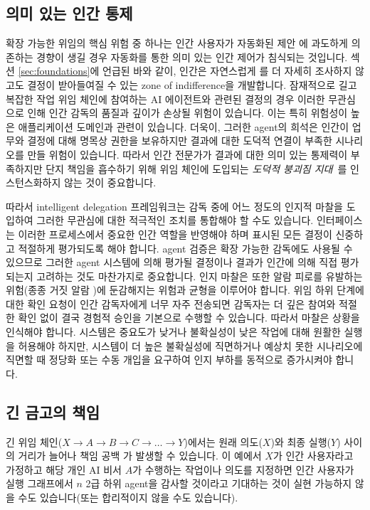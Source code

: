 \documentclass[11pt, a4paper, twocolumn, copyright, goog]{google}
\begin{document}
\subsection{의미 있는 인간 통제}

확장 가능한 위임의 핵심 위험 중 하나는 인간 사용자가 자동화된 제안 \citep{dzindolet2003role, logg2019algorithm}에 과도하게 의존하는 경향이 생길 경우 자동화를 통한 의미 있는 인간 제어가 침식되는 것입니다. 섹션 \ref{sec:foundations}에 언급된 바와 같이, 인간은 자연스럽게 \citep{parasuraman1993performance, green2022flaws}를 더 자세히 조사하지 않고도 결정이 받아들여질 수 있는 zone of indifference을 개발합니다. 잠재적으로 길고 복잡한 작업 위임 체인에 참여하는 AI 에이전트와 관련된 결정의 경우 이러한 무관심으로 인해 인간 감독의 품질과 깊이가 손상될 위험이 있습니다. 이는 특히 위험성이 높은 애플리케이션 도메인과 관련이 있습니다. 더욱이, 그러한 agent의 희석은 인간이 업무와 결정에 대해 명목상 권한을 보유하지만 결과에 대한 도덕적 연결이 부족한 시나리오를 만들 위험이 있습니다. 따라서 인간 전문가가 결과에 대한 의미 있는 통제력이 부족하지만 단지 책임을 흡수하기 위해 위임 체인에 도입되는 \emph{도덕적 붕괴짐 지대}~\citep{elish2019moral}를 인스턴스화하지 않는 것이 중요합니다.

따라서 intelligent delegation 프레임워크는 \citep{bader2019algorithmic} 감독 중에 어느 정도의 인지적 마찰을 도입하여 그러한 무관심에 대한 적극적인 조치를 통합해야 할 수도 있습니다. 인터페이스는 이러한 프로세스에서 중요한 인간 역할을 반영해야 하며 표시된 모든 결정이 신중하고 적절하게 평가되도록 해야 합니다. agent 검증은 확장 가능한 감독에도 사용될 수 있으므로 그러한 agent 시스템에 의해 평가될 결정이나 결과가 인간에 의해 직접 평가되는지 고려하는 것도 마찬가지로 중요합니다. 인지 마찰은 또한 알람 피로를 유발하는 위험(종종 거짓 알람 \citep{michels2025alarm})에 둔감해지는 위험과 균형을 이루어야 합니다. 위임 하위 단계에 대한 확인 요청이 인간 감독자에게 너무 자주 전송되면 감독자는 더 깊은 참여와 적절한 확인 없이 결국 경험적 승인을 기본으로 수행할 수 있습니다. 따라서 마찰은 상황을 인식해야 합니다. 시스템은 중요도가 낮거나 불확실성이 낮은 작업에 대해 원활한 실행을 허용해야 하지만, 시스템이 더 높은 불확실성에 직면하거나 예상치 못한 시나리오에 직면할 때 정당화 또는 수동 개입을 요구하여 인지 부하를 동적으로 증가시켜야 합니다.

\subsection{긴 금고의 책임}

긴 위임 체인($X \rightarrow A \rightarrow B \rightarrow C \rightarrow \ldots \rightarrow Y$)에서는 원래 의도($X$)와 최종 실행($Y$) 사이의 거리가 늘어나 책임 공백 \citep{slota2023many}가 발생할 수 있습니다. 이 예에서 $X$가 인간 사용자라고 가정하고 해당 개인 AI 비서 $A$가 수행하는 작업이나 의도를 지정하면 인간 사용자가 실행 그래프에서 $n$ 2급 하위 agent을 감사할 것이라고 기대하는 것이 실현 가능하지 않을 수도 있습니다(또는 합리적이지 않을 수도 있습니다).
\end{document}
